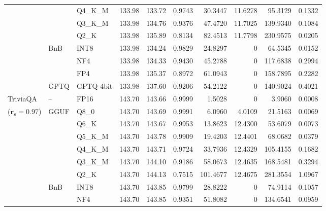 \begin{longtable}{ll l rrrrrrr}
 &  & Q4\_K\_M & 133.98 & 133.72 & 0.9743 & 30.3447 & 11.6278 & 95.3129 & 0.1332 \\
 &  & Q3\_K\_M & 133.98 & 134.76 & \cellcolor{red!18} 0.9376 & \cellcolor{red!18} 47.4720 & 11.7025 & \cellcolor{red!18} 139.9340 & \cellcolor{red!18} 0.1084 \\
 &  & Q2\_K & 133.98 & 135.89 & \cellcolor{red!18} 0.8134 & \cellcolor{red!18} 82.4513 & 11.7798 & \cellcolor{red!18} 230.9575 & \cellcolor{red!18} 0.0205 \\
 & BnB & INT8 & 133.98 & 134.24 & 0.9829 & 24.8297 & \cellcolor{cyan!12} $0$ & 64.5345 & 0.0152 \\
 &  & NF4 & 133.98 & 134.33 & \cellcolor{red!18} 0.9430 & \cellcolor{red!18} 45.2788 & \cellcolor{cyan!12} $0$ & \cellcolor{red!18} 117.6838 & \cellcolor{red!18} 0.2994 \\
 &  & FP4 & 133.98 & 135.37 & \cellcolor{red!18} 0.8972 & \cellcolor{red!18} 61.0943 & \cellcolor{cyan!12} $0$ & \cellcolor{red!18} 158.7895 & \cellcolor{red!18} 0.2282 \\
 & GPTQ & GPTQ-4bit & 133.98 & 137.60 & \cellcolor{red!18} 0.9206 & \cellcolor{red!18} 54.2122 & \cellcolor{cyan!12} $0$ & \cellcolor{red!18} 140.9024 & \cellcolor{red!18} 0.4021 \\
\midrule
TriviaQA & -- & FP16 & 143.70 & 143.66 & 0.9999 & 1.5028 & \cellcolor{cyan!12} $0$ & 3.9060 & 0.0008 \\
{\small ($\mathbf{r_s{=}0.97}$)} & GGUF & Q8\_0 & 143.70 & 143.69 & 0.9991 & 6.0960 & 4.0109 & 21.5163 & 0.0069 \\
 &  & Q6\_K & 143.70 & 143.67 & 0.9953 & 13.8623 & 12.4300 & 53.6079 & 0.0073 \\
 &  & Q5\_K\_M & 143.70 & 143.78 & 0.9909 & 19.4203 & 12.4401 & 68.0682 & 0.0379 \\
 &  & Q4\_K\_M & 143.70 & 143.71 & 0.9724 & 33.7936 & 12.4329 & 105.4155 & 0.1682 \\
 &  & Q3\_K\_M & 143.70 & 144.10 & \cellcolor{red!18} 0.9186 & \cellcolor{red!18} 58.0673 & 12.4635 & \cellcolor{red!18} 168.5481 & \cellcolor{red!18} 0.3294 \\
 &  & Q2\_K & 143.70 & 144.13 & \cellcolor{red!35} 0.7515 & \cellcolor{red!35} 101.4677 & 12.4675 & \cellcolor{red!35} 281.3554 & \cellcolor{red!35} 1.0967 \\
 & BnB & INT8 & 143.70 & 143.85 & 0.9799 & 28.8222 & \cellcolor{cyan!12} $0$ & 74.9114 & 0.1057 \\
 &  & NF4 & 143.70 & 143.85 & \cellcolor{red!18} 0.9351 & \cellcolor{red!18} 51.8082 & \cellcolor{cyan!12} $0$ & \cellcolor{red!18} 134.6541 & \cellcolor{red!18} 0.0959 \\

\end{longtable}
